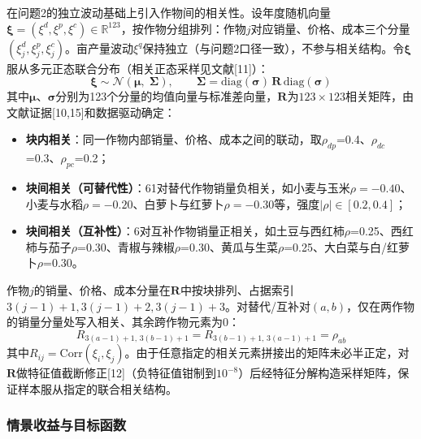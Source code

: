 \documentclass[12pt,a4paper]{article}
\begin{document}
在问题2的独立波动基础上引入作物间的相关性。设年度随机向量$\boldsymbol{\xi}=(\xi^d,\xi^p,\xi^c)\in\mathbb{R}^{123}$，按作物分组排列：作物$j$对应销量、价格、成本三个分量$(\xi^d_j,\xi^p_j,\xi^c_j)$。亩产量波动$\xi^q$保持独立（与问题2口径一致），不参与相关结构。令$\boldsymbol{\xi}$服从多元正态联合分布（相关正态采样见文献[11]）：
\begin{equation}
\boldsymbol{\xi}\sim\mathcal{N}(\boldsymbol{\mu},\;\boldsymbol{\Sigma}),\qquad \boldsymbol{\Sigma}=\mathrm{diag}(\boldsymbol{\sigma})\,\mathbf{R}\,\mathrm{diag}(\boldsymbol{\sigma})
\label{eq:corr}
\end{equation}
其中$\boldsymbol{\mu}$、$\boldsymbol{\sigma}$分别为123个分量的均值向量与标准差向量，$\mathbf{R}$为$123\times123$相关矩阵，由文献证据[10,15]和数据驱动确定：
\begin{itemize}
  \item \textbf{块内相关}：同一作物内部销量、价格、成本之间的联动，取$\rho_{dp}$=0.4、$\rho_{dc}$=0.3、$\rho_{pc}$=0.2；
  \item \textbf{块间相关（可替代性）}：61对替代作物销量负相关，如小麦与玉米$\rho=-0.40$、小麦与水稻$\rho=-0.20$、白萝卜与红萝卜$\rho=-0.30$等，强度$|\rho|\in[0.2,0.4]$；
  \item \textbf{块间相关（互补性）}：6对互补作物销量正相关，如土豆与西红柿$\rho$=0.25、西红柿与茄子$\rho$=0.30、青椒与辣椒$\rho$=0.30、黄瓜与生菜$\rho$=0.25、大白菜与白/红萝卜$\rho$=0.30。
\end{itemize}
作物$j$的销量、价格、成本分量在$\mathbf R$中按块排列、占据索引$3(j-1)+1,3(j-1)+2,3(j-1)+3$。对替代/互补对$(a,b)$，仅在两作物的销量分量处写入相关、其余跨作物元素为0：
\begin{equation}
R_{3(a-1)+1,\,3(b-1)+1}=R_{3(b-1)+1,\,3(a-1)+1}=\rho_{ab}
\label{eq:rho_ab}
\end{equation}
其中$R_{ij}=\mathrm{Corr}(\xi_i,\xi_j)$。由于任意指定的相关元素拼接出的矩阵未必半正定，对$\mathbf R$做特征值截断修正[12]（负特征值钳制到$10^{-8}$）后经特征分解构造采样矩阵，保证样本服从指定的联合相关结构。

\subsubsection{情景收益与目标函数}
\end{document}
